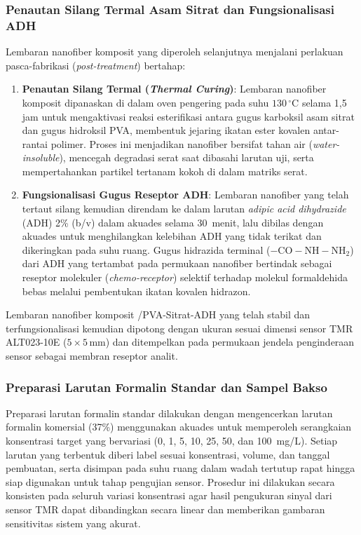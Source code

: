 \subsubsection{Penautan Silang Termal Asam Sitrat dan Fungsionalisasi ADH}
Lembaran nanofiber komposit yang diperoleh selanjutnya menjalani perlakuan pasca-fabrikasi (\textit{post-treatment}) bertahap:
\begin{enumerate}
    \item \textbf{Penautan Silang Termal (\textit{Thermal Curing})}: Lembaran nanofiber komposit dipanaskan di dalam oven pengering pada suhu $130\,^{\circ}\text{C}$ selama 1,5 jam untuk mengaktivasi reaksi esterifikasi antara gugus karboksil asam sitrat dan gugus hidroksil PVA, membentuk jejaring ikatan ester kovalen antar-rantai polimer. Proses ini menjadikan nanofiber bersifat tahan air (\textit{water-insoluble}), mencegah degradasi serat saat dibasahi larutan uji, serta mempertahankan partikel  tertanam kokoh di dalam matriks serat.
    \item \textbf{Fungsionalisasi Gugus Reseptor ADH}: Lembaran nanofiber yang telah tertaut silang kemudian direndam ke dalam larutan \textit{adipic acid dihydrazide} (ADH) 2\% (b/v) dalam akuades selama \SI{30}{menit}, lalu dibilas dengan akuades untuk menghilangkan kelebihan ADH yang tidak terikat dan dikeringkan pada suhu ruang. Gugus hidrazida terminal ($- \text{CO}-\text{NH}-\text{NH}_2$) dari ADH yang tertambat pada permukaan nanofiber bertindak sebagai reseptor molekuler (\textit{chemo-receptor}) selektif terhadap molekul formaldehida bebas melalui pembentukan ikatan kovalen hidrazon.
\end{enumerate}
Lembaran nanofiber komposit /PVA-Sitrat-ADH yang telah stabil dan terfungsionalisasi kemudian dipotong dengan ukuran sesuai dimensi sensor TMR ALT023-10E ($5 \times 5\,\text{mm}$) dan ditempelkan pada permukaan jendela penginderaan sensor sebagai membran reseptor analit.

\subsubsection{Preparasi Larutan Formalin Standar dan Sampel Bakso}
Preparasi larutan formalin standar dilakukan dengan mengencerkan larutan formalin komersial (37\%) menggunakan akuades untuk memperoleh serangkaian konsentrasi target yang bervariasi (0, 1, 5, 10, 25, 50, dan 100~mg/L). Setiap larutan yang terbentuk diberi label sesuai konsentrasi, volume, dan tanggal pembuatan, serta disimpan pada suhu ruang dalam wadah tertutup rapat hingga siap digunakan untuk tahap pengujian sensor. Prosedur ini dilakukan secara konsisten pada seluruh variasi konsentrasi agar hasil pengukuran sinyal dari sensor TMR dapat dibandingkan secara linear dan memberikan gambaran sensitivitas sistem yang akurat.

